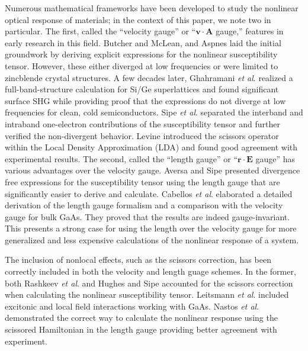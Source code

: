 \documentclass[floatfix,prb,aps,superscriptaddress,11pt,preprint,letterpaper]{revtex4}
\begin{document}
Numerous mathematical frameworks have been developed to study the 
nonlinear optical response of materials; 
in the context of this paper, we note two in particular. 
The first, called the ``velocity gauge'' or 
``$\mathbf{v}\cdot\mathbf{A}$ gauge,'' features in early 
research in this field. 
Butcher and McLean\cite{butcherPOPS63}, and 
Aspnes\cite{aspnesPRB72} 
laid the initial groundwork by deriving explicit expressions for the 
nonlinear susceptibility tensor. However, these either diverged at 
low frequencies or were limited to zincblende crystal structures. 
A few decades later, 
Ghahramani \emph{et al}.\cite{ghahramaniPRB91} 
realized a full-band-structure calculation for Si/Ge superlattices and 
found significant surface SHG while providing proof that the expressions 
do not diverge at low frequencies for clean, cold semiconductors. 
Sipe \emph{et al}.\cite{sipePRB93}
separated the interband and intraband one-electron contributions 
of the susceptibility tensor and further verified the non-divergent behavior. 
Levine\cite{levinePRB94} 
introduced the scissors operator within the Local Density Approximation
(LDA) and found good agreement with experimental results. 
The second, called the ``length gauge'' or 
``$\mathbf{r}\cdot\mathbf{E}$ gauge'' has various advantages over 
the velocity gauge. 
Aversa and Sipe\cite{aversaPRB95} 
presented divergence free expressions for the susceptibility tensor using 
the length gauge that are significantly easier to derive and calculate. 
Cabellos \emph{et al}.\cite{cabellosPRB09} 
elaborated a detailed derivation of the length gauge 
formalism and a comparison with the velocity gauge for bulk GaAs. They 
proved that the results are indeed gauge-invariant. 
This presents a strong case for using the length over the velocity gauge 
for more generalized and less expensive calculations of the nonlinear
response of a system.

The inclusion of nonlocal effects, such as the scissors correction, has been
correctly included in both the velocity and length guage schemes. 
In the former, both 
Rashkeev \emph{et al}.\cite{rashkeevPRB98} and 
Hughes and Sipe\cite{hughesPRB96} 
accounted for the scissors correction when calculating the nonlinear 
susceptibility tensor.
Leitsmann \emph{et al}.\cite{leitsmannPRB05} 
included excitonic and local field interactions working with GaAs.
Nastos \emph{et al}.\cite{nastosPRB05} demonstrated the correct 
way to calculate the nonlinear response using the scissored Hamiltonian 
in the length gauge providing better agreement with experiment. 
\end{document}
